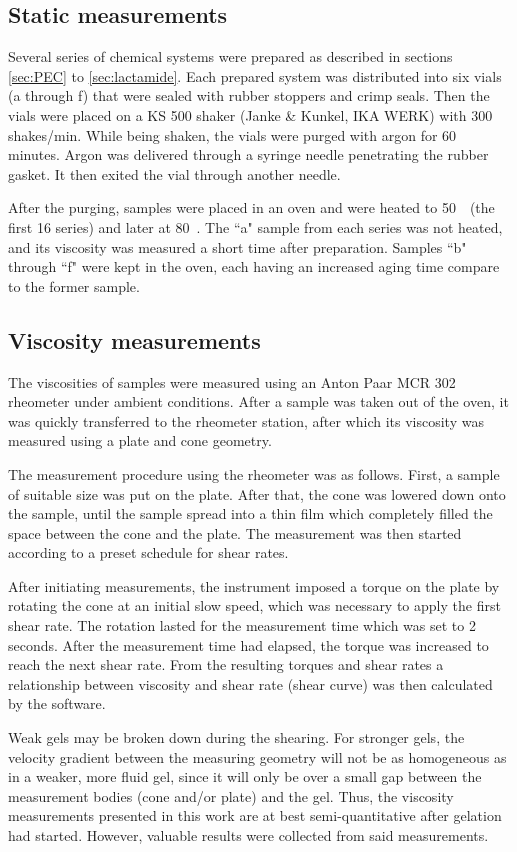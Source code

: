 \documentclass[nanomaterials,article,submit,moreauthors,pdftex]{Definitions/mdpi}
\begin{document}
\subsection{Static measurements}
Several series of chemical systems were prepared as described in sections \ref{sec:PEC} to \ref{sec:lactamide}.
Each prepared system was distributed into six vials (a through f) that were sealed with rubber stoppers and crimp seals. Then the vials were placed on a KS 500 shaker (Janke \& Kunkel, IKA WERK) with 300 shakes/min. While being shaken, the vials were purged with argon for 60 minutes. Argon was delivered through a syringe needle penetrating the rubber gasket. It then exited the vial through another needle.

After the purging, samples were placed in an oven and were heated to 50~\celsius~(the first 16 series) and later at 80~\celsius. The ``a" sample from each series was not heated, and its viscosity was measured a short time after preparation. Samples ``b" through ``f" were kept in the oven, each having an increased aging time compare to the former sample. 

\subsection{Viscosity measurements}
The viscosities of samples were measured using an Anton Paar MCR 302 rheometer under ambient conditions. After a sample was taken out of the oven, it was quickly transferred to the rheometer station, after which its viscosity was measured using a plate and cone geometry.

The measurement procedure using the rheometer was as follows. First, a sample of suitable size was put on the plate. After that, the cone was lowered down onto the sample, until the sample spread into a thin film which completely filled the space between the cone and the plate. The measurement was then started according to a preset schedule for shear rates. 

After initiating measurements, the instrument imposed a torque on the plate by rotating the cone at an initial slow speed, which was necessary to apply the first shear rate. The rotation lasted for the measurement time which was set to 2 seconds. After the measurement time had elapsed, the torque was increased to reach the next shear rate. From the resulting torques and shear rates a relationship between viscosity and shear rate (shear curve) was then calculated by the software.

Weak gels may be broken down during the shearing. For stronger gels, the velocity gradient between the measuring geometry will not be as homogeneous as in a weaker, more fluid gel, since it will only be over a small gap between the measurement bodies (cone and/or plate) and the gel. Thus, the viscosity measurements presented in this work are at best semi-quantitative after gelation had started. However, valuable results were collected from said measurements.
\end{document}
